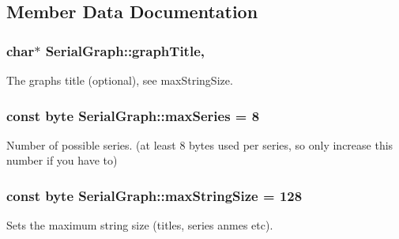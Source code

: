 \subsection{Member Data Documentation}
\hypertarget{class_serial_graph_a0b33d43c2bb54340ef1f90b5f76d7aea}{}
\subsubsection[{graph\+Title}]{\setlength{\rightskip}{0pt plus 5cm}char$\ast$ Serial\+Graph\+::graph\+Title\hspace{0.3cm}{\ttfamily [protected]}, {\ttfamily [inherited]}}\label{class_serial_graph_a0b33d43c2bb54340ef1f90b5f76d7aea}
The graphs title (optional), see max\+String\+Size. \hypertarget{class_serial_graph_a752a1429bd35687163fe11c5a2562bef}{}
\subsubsection[{max\+Series}]{\setlength{\rightskip}{0pt plus 5cm}const byte Serial\+Graph\+::max\+Series = 8\hspace{0.3cm}{\ttfamily [inherited]}}\label{class_serial_graph_a752a1429bd35687163fe11c5a2562bef}
Number of possible series. (at least 8 bytes used per series, so only increase this number if you have to) \hypertarget{class_serial_graph_a1867ab3a93268646490fa7ba4f8b5680}{}
\subsubsection[{max\+String\+Size}]{\setlength{\rightskip}{0pt plus 5cm}const byte Serial\+Graph\+::max\+String\+Size = 128\hspace{0.3cm}{\ttfamily [inherited]}}\label{class_serial_graph_a1867ab3a93268646490fa7ba4f8b5680}
Sets the maximum string size (titles, series anmes etc). \hypertarget{class_serial_graph_ab40c430e06102b9624736173d4a58596}{}
